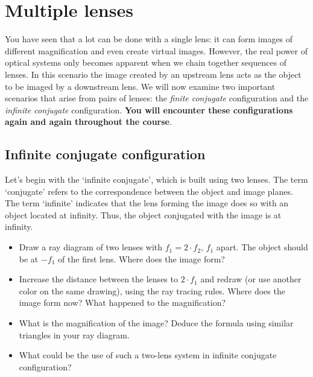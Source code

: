 \documentclass[a4paper]{report}
\begin{document}
    \clearpage


	\section{Multiple lenses}

	You have seen that a lot can be done with a single lens: it can form images of different magnification and even create virtual images.
	However, the real power of optical systems only becomes apparent when we chain together sequences of lenses.
	In this scenario the image created by an upstream lens acts as the object to be imaged by a downstream lens.
	We will now examine two important scenarios that arise from pairs of lenses: the \emph{finite conjugate} configuration and the \emph{infinite conjugate} configuration.
	\textbf{You will encounter these configurations again and again throughout the course}.

	\subsection{Infinite conjugate configuration}
	\hypertarget{hintBack-infinite}{}

	Let's begin with the `infinite conjugate', which is built using two lenses.
	The term `conjugate' refers to the correspondence between the object and image planes.
	The term `infinite' indicates that the lens forming the image does so with an object located at infinity.
	Thus, the object conjugated with the image is at infinity.

	\begin{itemize}
		\item Draw a ray diagram of two lenses with $f_1=2 \cdot f_2$, $f_1$ apart. The object should be at $-f_1$ of the first lens. Where does the image form?
		\item Increase the distance between the lenses to $2\cdot f_1$ and redraw (or use another color on the same drawing), using the ray tracing rules. Where does the image form now? What happened to the magnification?
		\item What is the magnification of the image? Deduce the formula using similar triangles in your ray diagram.
		\item What could be the use of such a two-lens system in infinite conjugate configuration?
	\end{itemize}
\end{document}

